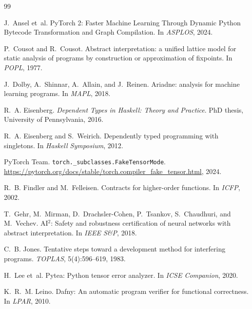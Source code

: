 \begin{thebibliography}{99}

J.~Ansel et~al.
\newblock PyTorch 2: Faster Machine Learning Through Dynamic Python
  Bytecode Transformation and Graph Compilation.
\newblock In \emph{ASPLOS}, 2024.

P.~Cousot and R.~Cousot.
\newblock Abstract interpretation: a unified lattice model for
  static analysis of programs by construction or approximation of
  fixpoints.
\newblock In \emph{POPL}, 1977.

J.~Dolby, A.~Shinnar, A.~Allain, and J.~Reinen.
\newblock Ariadne: analysis for machine learning programs.
\newblock In \emph{MAPL}, 2018.

R.~A. Eisenberg.
\newblock \emph{Dependent Types in Haskell: Theory and Practice}.
\newblock PhD thesis, University of Pennsylvania, 2016.

R.~A. Eisenberg and S.~Weirich.
\newblock Dependently typed programming with singletons.
\newblock In \emph{Haskell Symposium}, 2012.

PyTorch Team.
\newblock \texttt{torch.\_subclasses.FakeTensorMode}.
\newblock \url{https://pytorch.org/docs/stable/torch.compiler_fake_tensor.html}, 2024.

R.~B. Findler and M.~Felleisen.
\newblock Contracts for higher-order functions.
\newblock In \emph{ICFP}, 2002.

T.~Gehr, M.~Mirman, D.~Drachsler-Cohen, P.~Tsankov, S.~Chaudhuri,
  and M.~Vechev.
\newblock AI$^2$: Safety and robustness certification of neural
  networks with abstract interpretation.
\newblock In \emph{IEEE S\&P}, 2018.

C.~B. Jones.
\newblock Tentative steps toward a development method for
  interfering programs.
\newblock \emph{TOPLAS}, 5(4):596--619, 1983.

H.~Lee et~al.
\newblock Pytea: Python tensor error analyzer.
\newblock In \emph{ICSE Companion}, 2020.

K.~R.~M. Leino.
\newblock Dafny: An automatic program verifier for functional
  correctness.
\newblock In \emph{LPAR}, 2010.


\end{thebibliography}
